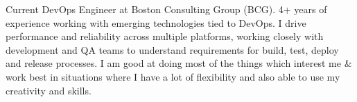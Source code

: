 

\begin{cvparagraph}


Current DevOps Engineer at Boston Consulting Group (BCG). 4+ years of experience working with emerging technologies tied to DevOps. I drive performance and reliability across multiple platforms, working closely with development and QA teams to understand requirements for build, test, deploy and release processes. I am good at doing most of the things which interest me \& work best in situations where I have a lot of flexibility and also able to use my creativity and skills.
\end{cvparagraph}
